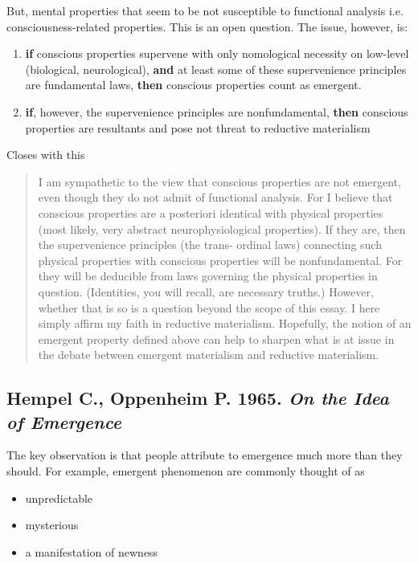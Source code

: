 \documentclass{article}
\newcommand{\ti}[1]{\textit{#1}}
\newcommand{\tb}[1]{\textbf{#1}}
\newcommand{\annbibtitle}[2]{\subsection*{#1. \ti{#2}}}
\begin{document}
But, mental properties that seem to be not susceptible to functional analysis i.e. consciousness-related properties. This is an open question. The issue, however, is:
\begin{enumerate}
    \item \tb{if} conscious properties supervene with only nomological necessity on low-level (biological, neurological), \tb{and} at least some of these supervenience principles are fundamental laws, \tb{then} conscious properties count as emergent.
    \item \tb{if}, however, the supervenience principles are nonfundamental, \tb{then} conscious properties are resultants and pose not threat to reductive materialism
\end{enumerate}

Closes with this

\begin{quote}
I am sympathetic to the view that conscious properties are not emergent, even though they do not admit of functional analysis. For I believe that conscious properties are a posteriori identical with physical properties (most likely, very abstract neurophysiological properties). If they are, then the supervenience principles (the trans- ordinal laws) connecting such physical properties with conscious properties will be nonfundamental. For they will be deducible from laws governing the physical properties in question. (Identities, you will recall, are necessary truths.) However, whether that is so is a question beyond the scope of this essay. I here simply affirm my faith in reductive materialism. Hopefully, the notion of an emergent property defined above can help to sharpen what is at issue in the debate between emergent materialism and reductive materialism.
\end{quote}

\annbibtitle{Hempel C., Oppenheim P. 1965}{On the Idea of Emergence}

The key observation is that people attribute to emergence much more than they should. For example, emergent phenomenon are commonly thought of as

\begin{itemize}
    \item unpredictable
    \item mysterious
    \item a manifestation of newness
\end{itemize}
\end{document}
